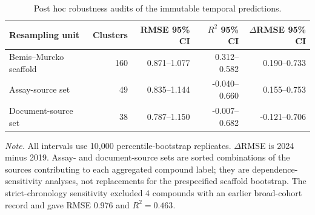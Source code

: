 \begin{table}[H]
\centering
\caption{Post hoc robustness audits of the immutable temporal predictions.}
\label{tab:temporal-robustness}
\small
\begin{tabular}{L{0.28\textwidth}rrrr}
\toprule
\textbf{Resampling unit} & \textbf{Clusters} & \textbf{RMSE 95\% CI} & \textbf{$R^2$ 95\% CI} & \textbf{$\Delta$RMSE 95\% CI} \\
\midrule
Bemis--Murcko scaffold & 160 & 0.871--1.077 & 0.312--0.582 & 0.190--0.733 \\
Assay-source set & 49 & 0.835--1.144 & -0.040--0.660 & 0.155--0.753 \\
Document-source set & 38 & 0.787--1.150 & -0.007--0.682 & -0.121--0.706 \\
\bottomrule
\end{tabular}
\par\vspace{3pt}\parbox{0.94\textwidth}{\footnotesize \textit{Note.} All intervals use 10,000 percentile-bootstrap replicates. $\Delta$RMSE is 2024 minus 2019. Assay- and document-source sets are sorted combinations of the sources contributing to each aggregated compound label; they are dependence-sensitivity analyses, not replacements for the prespecified scaffold bootstrap. The strict-chronology sensitivity excluded 4 compounds with an earlier broad-cohort record and gave RMSE 0.976 and $R^2=0.463$.}
\end{table}

